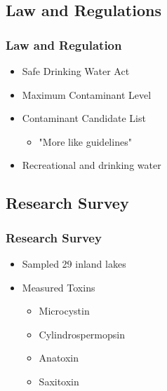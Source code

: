 \documentclass{beamer}
\begin{document}
\subsection{Law and Regulations}
\begin{frame}
	\frametitle{Law and Regulation}

	\begin{itemize}
		\item Safe Drinking Water Act
		\item Maximum Contaminant Level
		\item Contaminant Candidate List
			\begin{itemize}
				\item "More like guidelines"
			\end{itemize}

		\item Recreational and drinking water
	\end{itemize}

		

\end{frame}
\subsection{Research Survey}
\begin{frame}
	\frametitle{Research Survey}
	\begin{itemize}
		\item Sampled 29 inland lakes
		\item Measured Toxins
			\begin{itemize}
				\item Microcystin 
				\item Cylindrospermopsin 
				\item Anatoxin 
				\item Saxitoxin
			\end{itemize}

			
	\end{itemize}

	

	

\end{frame}
\end{document}
